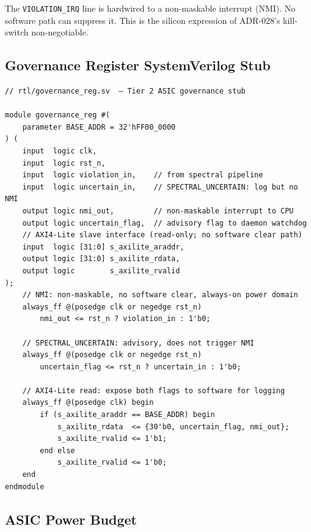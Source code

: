 \documentclass[12pt,letterpaper]{article}
\theoremstyle{plain}
\theoremstyle{definition}
\theoremstyle{remark}
\begin{document}
The \texttt{VIOLATION\_IRQ} line is hardwired to a non-maskable interrupt (NMI).
No software path can suppress it. This is the silicon expression of ADR-028's
kill-switch non-negotiable.

\subsection{Governance Register SystemVerilog Stub}

\begin{lstlisting}[style=verilogstyle, caption={Governance register NMI stub (ADR-028/ADR-032)}, label=lst:sv]
// rtl/governance_reg.sv  — Tier 2 ASIC governance stub

module governance_reg #(
    parameter BASE_ADDR = 32'hFF00_0000
) (
    input  logic clk,
    input  logic rst_n,
    input  logic violation_in,    // from spectral pipeline
    input  logic uncertain_in,    // SPECTRAL_UNCERTAIN: log but no NMI
    output logic nmi_out,         // non-maskable interrupt to CPU
    output logic uncertain_flag,  // advisory flag to daemon watchdog
    // AXI4-Lite slave interface (read-only; no software clear path)
    input  logic [31:0] s_axilite_araddr,
    output logic [31:0] s_axilite_rdata,
    output logic        s_axilite_rvalid
);
    // NMI: non-maskable, no software clear, always-on power domain
    always_ff @(posedge clk or negedge rst_n)
        nmi_out <= rst_n ? violation_in : 1'b0;

    // SPECTRAL_UNCERTAIN: advisory, does not trigger NMI
    always_ff @(posedge clk or negedge rst_n)
        uncertain_flag <= rst_n ? uncertain_in : 1'b0;

    // AXI4-Lite read: expose both flags to software for logging
    always_ff @(posedge clk) begin
        if (s_axilite_araddr == BASE_ADDR) begin
            s_axilite_rdata  <= {30'b0, uncertain_flag, nmi_out};
            s_axilite_rvalid <= 1'b1;
        end else
            s_axilite_rvalid <= 1'b0;
    end
endmodule
\end{lstlisting}

\subsection{ASIC Power Budget}
\end{document}
